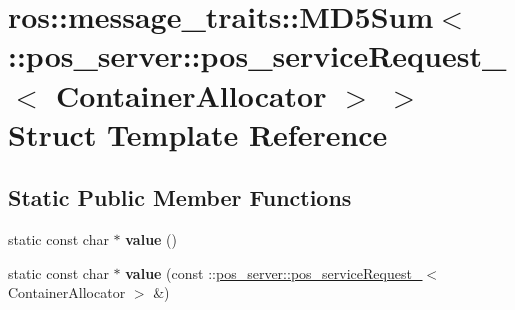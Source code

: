 \hypertarget{structros_1_1message__traits_1_1MD5Sum_3_01_1_1pos__server_1_1pos__serviceRequest___3_01ContainerAllocator_01_4_01_4}{}\section{ros\+:\+:message\+\_\+traits\+:\+:M\+D5\+Sum$<$ \+:\+:pos\+\_\+server\+:\+:pos\+\_\+service\+Request\+\_\+$<$ Container\+Allocator $>$ $>$ Struct Template Reference}
\label{structros_1_1message__traits_1_1MD5Sum_3_01_1_1pos__server_1_1pos__serviceRequest___3_01ContainerAllocator_01_4_01_4}
\subsection*{Static Public Member Functions}
\begin{DoxyCompactItemize}
\item 
\mbox{\label{structros_1_1message__traits_1_1MD5Sum_3_01_1_1pos__server_1_1pos__serviceRequest___3_01ContainerAllocator_01_4_01_4_a6a0963a104fc145f8f3c4f6cccd45c8b}} 
static const char $\ast$ {\bfseries value} ()
\item 
\mbox{\label{structros_1_1message__traits_1_1MD5Sum_3_01_1_1pos__server_1_1pos__serviceRequest___3_01ContainerAllocator_01_4_01_4_a4c4b2294e5b6194f66a838ec2bd1c154}} 
static const char $\ast$ {\bfseries value} (const \+::\hyperlink{structpos__server_1_1pos__serviceRequest__}{pos\+\_\+server\+::pos\+\_\+service\+Request\+\_\+}$<$ Container\+Allocator $>$ \&)
\end{DoxyCompactItemize}
